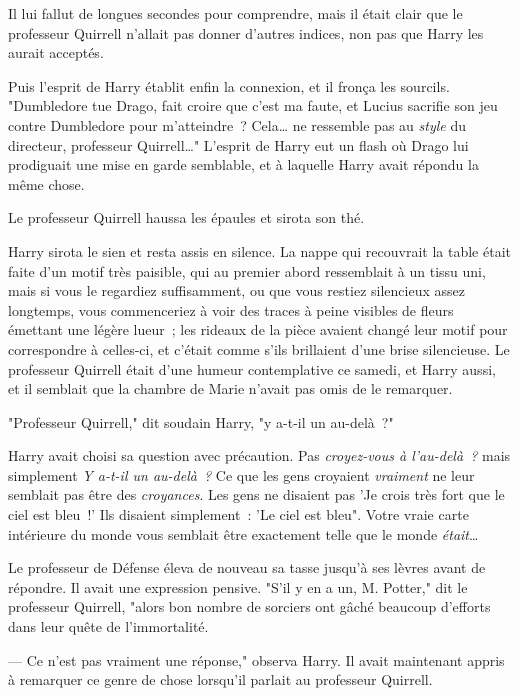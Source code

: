 Il lui fallut de longues secondes pour comprendre, mais il était clair que le professeur Quirrell n'allait pas donner d'autres indices, non pas que Harry les aurait acceptés.

Puis l'esprit de Harry établit enfin la connexion, et il fronça les sourcils. "Dumbledore tue Drago, fait croire que c'est ma faute, et Lucius sacrifie son jeu contre Dumbledore pour m'atteindre~? Cela… ne ressemble pas au \emph{style} du directeur, professeur Quirrell…" L'esprit de Harry eut un flash où Drago lui prodiguait une mise en garde semblable, et à laquelle Harry avait répondu la même chose.

Le professeur Quirrell haussa les épaules et sirota son thé.

Harry sirota le sien et resta assis en silence. La nappe qui recouvrait la table était faite d'un motif très paisible, qui au premier abord ressemblait à un tissu uni, mais si vous le regardiez suffisamment, ou que vous restiez silencieux assez longtemps, vous commenceriez à voir des traces à peine visibles de fleurs émettant une légère lueur~; les rideaux de la pièce avaient changé leur motif pour correspondre à celles-ci, et c'était comme s'ils brillaient d'une brise silencieuse. Le professeur Quirrell était d'une humeur contemplative ce samedi, et Harry aussi, et il semblait que la chambre de Marie n'avait pas omis de le remarquer.

"Professeur Quirrell," dit soudain Harry, "y a-t-il un au-delà~?"

Harry avait choisi sa question avec précaution. Pas \emph{croyez-vous à l'au-delà~?} mais simplement \emph{Y a-t-il un au-delà~?} Ce que les gens croyaient \emph{vraiment} ne leur semblait pas être des \emph{croyances}. Les gens ne disaient pas 'Je crois très fort que le ciel est bleu~!' Ils disaient simplement~: 'Le ciel est bleu". Votre vraie carte intérieure du monde vous semblait être exactement telle que le monde \emph{était}…

Le professeur de Défense éleva de nouveau sa tasse jusqu'à ses lèvres avant de répondre. Il avait une expression pensive. "S'il y en a un, M. Potter," dit le professeur Quirrell, "alors bon nombre de sorciers ont gâché beaucoup d'efforts dans leur quête de l'immortalité.

--- Ce n'est pas vraiment une réponse," observa Harry. Il avait maintenant appris à remarquer ce genre de chose lorsqu'il parlait au professeur Quirrell.

